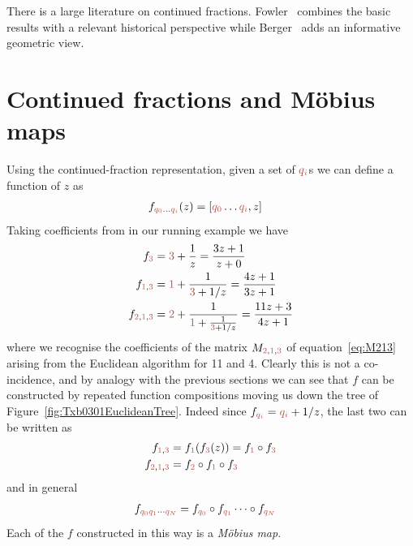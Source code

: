 There is a large literature on continued fractions. Fowler~\cite{fowlerMathematicsPlatoAcademy1999} combines the basic results with a relevant historical perspective while Berger~\cite{bergerGeometryRevealedJacob2010} adds an informative geometric view. 

\section{Continued fractions and M\"obius maps}
\newcommand{\wC}{z}%
Using the continued-fraction representation, given a set of $\jqix{i}$s we can define a function of $\wC$ as
\begin{align}
	f_{\jqix{0}\ldots \jqix{i}}(\wC) &= [\jqix{0}\ldots \jqix{i}  , \wC] 
\end{align}
Taking coefficients from in our running example we  have 
\begin{align}
	\begin{split}
f_{\jqn{3}}&=  \jqn{3} + \frac{1}{\wC} = \frac{3 \wC+1}{\wC+0} 
\\
f_{\jqn{1},\jqn{3}}  &=  \jqn{1} + \frac{1}{\jqn{3}+1/\wC} = \frac{4 \wC+1}{3\wC+1} 
\\ 
f_{\jqn{2},\jqn{1},\jqn{3}}  &=  \jqn{2} + \frac{1}{\jqn{1}+\frac{1}{
		\jqn{3}+1/\wC}} = \frac{11 \wC+3}{4\wC+1} %
	\end{split}\label{eq:fq}
\end{align}
where we recognise the coefficients of the matrix $M_{\jqn{2},\jqn{1},\jqn{3}}$ of equation~\ref{eq:M213} arising from the Euclidean algorithm for 11 and 4. Clearly this is not a co-incidence, and by analogy with the previous sections we can see that $f$ can be constructed by repeated function compositions moving us down the tree of Figure~\ref{fig:Txb0301EuclideanTree}. 
Indeed since $	f_{\jqix{i}}  =  \jqix{i} +1/{\wC}  $, the last two can be written as
\begin{align}	
	f_{\jqn{1},\jqn{3}}  &=  	f_{\jqn{1}}(	f_{\jqn{3}}(\wC)) = 	f_{\jqn{1}}\circ 	f_{\jqn{3}}
	\\	f_{\jqn{2},\jqn{1},\jqn{3}}  &=
	 f_{\jqn{2}}\circ 	f_{\jqn{1}} \circ 	f_{\jqn{3}}
\end{align}
and in general
\begin{align}
	f_{\jqix{0}\jqix{1}\cdots\jqix{N}} &= 	f_{\jqix{0}}\circ f_{\jqix{1}}\cdots\circ f_{\jqix{N}}
\end{align}
Each of the $f$ constructed in this way is a \textit{M\"obius map}.


